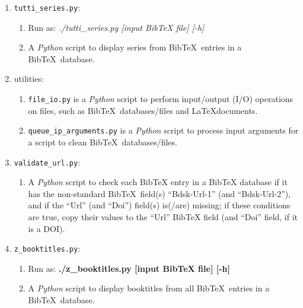 \begin{enumerate}
\begin{enumerate}
	\end{enumerate}
\item {\tt tutti\_series.py}: \vspace{-0.3cm}
	\begin{enumerate} \itemsep -2pt
	\item Run as: {\it ./tutti_series.py [input BibTeX file] [-h]}
	\item A {\it Python} script to display series from {\sc Bib}\TeX\ entries in a {\sc Bib}\TeX\ database.
	\end{enumerate}
\item utilities: \vspace{-0.3cm}
	\begin{enumerate} \itemsep -2pt
	\item {\tt file\_io.py} is a {\it Python} script to perform input/output (I/O) operations on files, such as {\sc Bib}\TeX\ databases/files and \LaTeX documents.
	\item {\tt queue\_ip\_arguments.py} is a {\it Python} script to process input arguments for a script to clean {\sc Bib}\TeX\ databases/files.
	\end{enumerate}
\item {\tt validate\_url.py}: \vspace{-0.3cm}
	\begin{enumerate} \itemsep -2pt
	\item A {\it Python} script to check each BibTeX entry in a BibTeX database if it has the non-standard {\sc Bib}\TeX\ field(s) ``Bdsk-Url-1'' (and ``Bdsk-Url-2''), and if the ``Url'' (and ``Doi'') field(s) is(/are) missing; if these conditions are true, copy their values to the ``Url'' BibTeX field (and ``Doi'' field, if it is a DOI).
	\end{enumerate}
\item {\tt z\_booktitles.py}: \vspace{-0.3cm}
	\begin{enumerate} \itemsep -2pt
	\item Run as: {\bf ./z_booktitles.py [input BibTeX file] [-h]}
	\item A {\it Python} script to display booktitles from all {\sc Bib}\TeX\ entries in a {\sc Bib}\TeX\ database.
	\end{enumerate}
\end{enumerate}

























